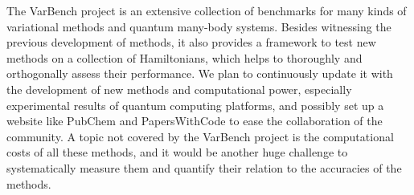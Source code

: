 The VarBench project is an extensive collection of benchmarks for many kinds of variational methods and quantum many-body systems. Besides witnessing the previous development of methods, it also provides a framework to test new methods on a collection of Hamiltonians, which helps to thoroughly and orthogonally assess their performance. We plan to continuously update it with the development of new methods and computational power, especially experimental results of quantum computing platforms, and possibly set up a website like PubChem and PapersWithCode to ease the collaboration of the community. A topic not covered by the VarBench project is the computational costs of all these methods, and it would be another huge challenge to systematically measure them and quantify their relation to the accuracies of the methods.
